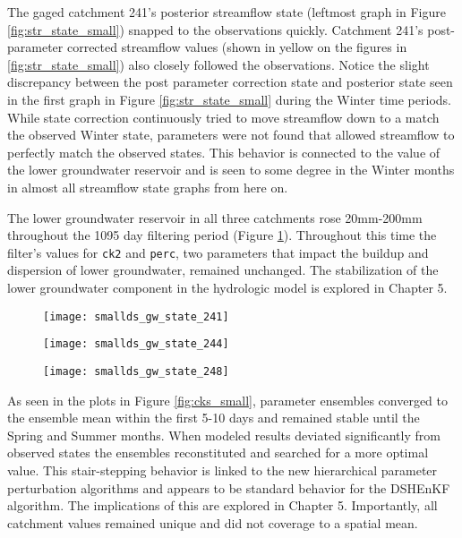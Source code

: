 The gaged catchment 241's posterior streamflow state (leftmost graph in Figure \ref{fig:str_state_small}) snapped to the observations quickly. Catchment 241's post-parameter corrected streamflow values (shown in yellow on the figures in \ref{fig:str_state_small}) also closely followed the observations. Notice the slight discrepancy between the post parameter correction state and posterior state seen in the first graph in Figure \ref{fig:str_state_small} during the Winter time periods. While state correction continuously tried to move streamflow down to a match the observed Winter state, parameters were not found that allowed streamflow to perfectly match the observed states. This behavior is connected to the value of the lower groundwater reservoir and is seen to some degree in the Winter months in almost all streamflow state graphs from here on.

The lower groundwater reservoir in all three catchments  rose 20mm-200mm throughout the 1095 day filtering period (Figure \ref{fig:gw_small}). Throughout this time the filter's values for \texttt{ck2} and \texttt{perc}, two parameters that impact the buildup and dispersion of lower groundwater, remained unchanged. The stabilization of the lower groundwater component in the hydrologic model is explored in Chapter 5.

\begin{figure}
\centering
\begin{minipage}{.33\textwidth}
  \centering
  \texttt{[image: smallds\_gw\_state\_241]}
  \label{fig:241gw}
\end{minipage}%
\begin{minipage}{.33\textwidth}
  \centering
  \texttt{[image: smallds\_gw\_state\_244]}
  \label{fig:244gw}
\end{minipage}
\begin{minipage}{.33\textwidth}
  \centering
  \texttt{[image: smallds\_gw\_state\_248]}
  \label{fig:248gw}
\end{minipage}
\label{fig:gw_small}
\end{figure}

As seen in the plots in Figure \ref{fig:cks_small}, parameter ensembles converged to the ensemble mean within the first 5-10 days and remained stable until the Spring and Summer months. When modeled results deviated significantly from observed states the ensembles reconstituted and searched for a more optimal value. This stair-stepping behavior is linked to the new hierarchical parameter perturbation algorithms and appears to be standard behavior for the DSHEnKF algorithm. The implications of this are explored in Chapter 5. Importantly, all catchment values remained unique and did not coverage to a spatial mean.

